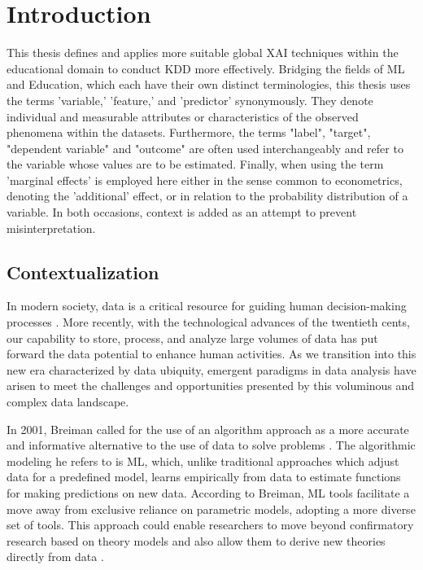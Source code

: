 \chapter{Introduction}
\label{contextualizacao}
This thesis defines and applies more suitable global \gls{XAI} techniques within the educational domain to conduct \gls{KDD} more effectively. Bridging the fields of \gls{ML} and Education, which each have their own distinct terminologies, this thesis uses the terms 'variable,' 'feature,' and 'predictor' synonymously. They denote individual and measurable attributes or characteristics of the observed phenomena within the datasets.  Furthermore, the terms "label", "target", "dependent variable" and "outcome" are often used interchangeably and refer to the variable whose values are to be estimated.  Finally, when using the term 'marginal effects' is employed here either in the sense common to econometrics, denoting the 'additional' effect, or in relation to the probability distribution of a variable. In both occasions, context is added as an attempt to prevent  misinterpretation. 

\section{Contextualization}

In modern society, data is a critical resource for guiding human decision-making processes \cite{J.Han2012DataTechniques}. More recently, with the technological advances of the twentieth cents, our capability to store, process, and analyze large volumes of data has put forward the data potential to enhance human activities. As we transition into this new era characterized by data ubiquity, emergent paradigms in data analysis have arisen to meet the challenges and opportunities presented by this voluminous and complex data landscape. 

In 2001, Breiman called for the use of an algorithm approach as a more accurate and informative alternative to the use of data to solve problems \cite{Breiman2001StatisticalAuthor}. The algorithmic modeling he refers to is ML, which, unlike traditional approaches which adjust data for a predefined model, learns empirically from data to estimate functions for making predictions on new data. According to Breiman, ML tools facilitate a move away from exclusive reliance on parametric models, adopting a more diverse set of tools. This approach could enable researchers to move beyond confirmatory research based on theory models and also allow them to derive new theories directly from data \cite{Molina2019AnnualSociology}.

